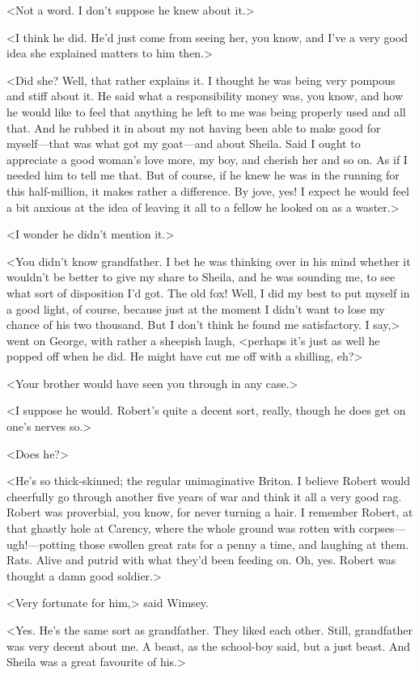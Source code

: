 <Not a word. I don't suppose he knew about it.>

<I think he did. He'd just come from seeing her, you know, and I've a very good idea she explained matters to him then.>

<Did she? Well, that rather explains it. I thought he was being very pompous and stiff about it. He said what a responsibility money was, you know, and how he would like to feel that anything he left to me was being properly used and all that. And he rubbed it in about my not having been able to make good for myself—that was what got my goat—and about Sheila. Said I ought to appreciate a good woman's love more, my boy, and cherish her and so on. As if I needed him to tell me that. But of course, if he knew he was in the running for this half-million, it makes rather a difference. By jove, yes! I expect he would feel a bit anxious at the idea of leaving it all to a fellow he looked on as a waster.>

<I wonder he didn't mention it.>

<You didn't know grandfather. I bet he was thinking over in his mind whether it wouldn't be better to give my share to Sheila, and he was sounding me, to see what sort of disposition I'd got. The old fox! Well, I did my best to put myself in a good light, of course, because just at the moment I didn't want to lose my chance of his two thousand. But I don't think he found me satisfactory. I say,> went on George, with rather a sheepish laugh, <perhaps it's just as well he popped off when he did. He might have cut me off with a shilling, eh?>

<Your brother would have seen you through in any case.>

<I suppose he would. Robert's quite a decent sort, really, though he does get on one's nerves so.>

<Does he?>

<He's so thick-skinned; the regular unimaginative Briton. I believe Robert would cheerfully go through another five years of war and think it all a very good rag. Robert was proverbial, you know, for never turning a hair. I remember Robert, at that ghastly hole at Carency, where the whole ground was rotten with corpses—ugh!—potting those swollen great rats for a penny a time, and laughing at them. Rats. Alive and putrid with what they'd been feeding on. Oh, yes. Robert was thought a damn good soldier.>

<Very fortunate for him,> said Wimsey.

<Yes. He's the same sort as grandfather. They liked each other. Still, grandfather was very decent about me. A beast, as the school-boy said, but a just beast. And Sheila was a great favourite of his.>

